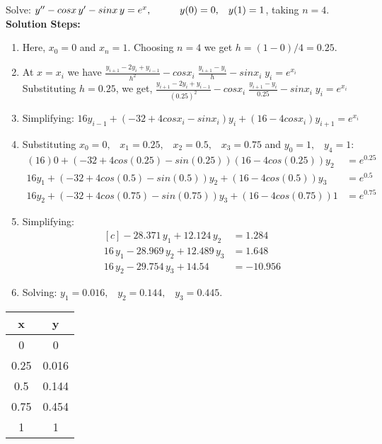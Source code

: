 \documentclass[aima203_lecturenotes_ku.tex]{subfiles}
\begin{document}
\begin{example}
  Solve: $y'' - cosx\, y' -sinx \, y = e^x, \hspace{10mm} y(0)=0, \hspace{3mm} y(1)=1$, taking $n=4$.\\
  \textbf{Solution Steps:}
  \begin{enumerate}
  \item   Here, $x_0 = 0$ and $x_n = 1$. Choosing $n=4$ we get $h = (1-0)/4 = 0.25$.

  \item At $x=x_i$ we have $\displaystyle \frac{y_{i+1} - 2y_i+ y_{i-1}}{h^2} -cosx_i \; \frac{y_{i+1} - y_i}{h} - sinx_i \; y_i = e^{x_i}$ \\[1mm]
    Substituting $h=0.25$, we  get, $\displaystyle \frac{y_{i+1} - 2y_i+ y_{i-1}}{(0.25)^2} -cosx_i \; \frac{y_{i+1} - y_i}{0.25} - sinx_i \; y_i = e^{x_i}$

\item Simplifying: $16y_{i-1} + (-32+4cosx_i-sinx_i)y_i + (16 -4cosx_i)y_{i+1} = e^{x_i}$


\item Substituting $x_0=0, \;\;\; x_1=0.25, \;\;\; x_2=0.5, \;\;\; x_3= 0.75$ and $y_0=1, \;\;\; y_4=1$:
  \begin{align*}
    (16)0 + (-32+4cos(0.25)-sin(0.25)) (16 -4cos(0.25))y_2 &= e^{0.25} \\[1mm]
    16y_1 + (-32+4cos(0.5)-sin(0.5))y_2 + (16 -4cos(0.5))y_3 &= e^{0.5} \\[1mm]
    16y_2 + (-32+4cos(0.75)-sin(0.75))y_3 + (16 -4cos(0.75))1 &= e^{0.75}
  \end{align*}

\item Simplifying:
  \begin{equation}
    \label{examplesystem}
  \begin{aligned}[c]
    -28.371\, y_1 + 12.124 \, y_2 &= 1.284 \\[1mm]
    16 \, y_1 - 28.969\, y_2 +12.489 \, y_3 &= 1.648 \\[1mm]
    16 \, y_2  -29.754\, y_3 + 14.54 &= -10.956
  \end{aligned}
\end{equation}

\item Solving: $y_1 = 0.016, \;\;\; y_2=0.144, \;\;\; y_3=0.445$.
\end{enumerate}
\begin{table}[h]
  \centering
  \begin{tabular}{|c|c|}
    \hline
    x&y \\
    \hline
    0 & 0 \\
    0.25 & 0.016 \\
    0.5 & 0.144 \\
    0.75 & 0.454 \\
    1 & 1 \\
    \hline
  \end{tabular}
\end{table}

\end{example}
\end{document}
